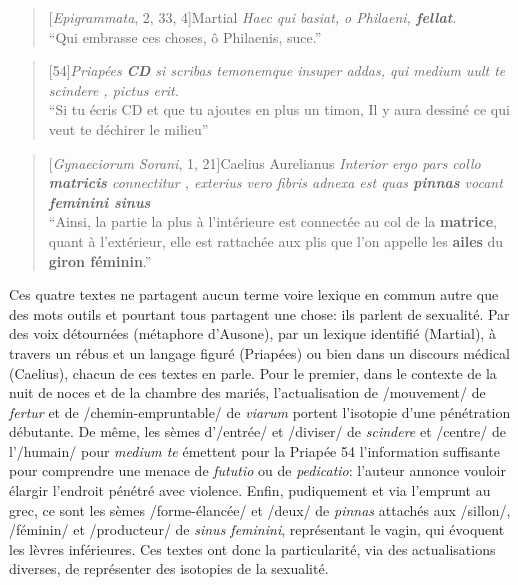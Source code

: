 \begin{quote}[\textit{Epigrammata}, 2, 33, 4]{Martial}
    \textit{Haec qui basiat, o Philaeni, \textbf{fellat}. \\}
    \enquote{Qui embrasse ces choses, ô Philaenis, suce.}
\end{quote}

\begin{quote}[54]{\textit{Priapées}}
    \textit{\textbf{CD} si scribas temonemque insuper addas, qui medium uult te scindere , pictus erit.} \\
    \enquote{Si tu écris CD et que tu ajoutes en plus un timon, Il y aura dessiné ce qui veut te déchirer le milieu}
\end{quote}

\begin{quote}[\textit{Gynaeciorum Sorani}, 1, 21]{Caelius Aurelianus}
    \textit{Interior ergo pars collo \textbf{matricis} connectitur , exterius vero fibris adnexa est quas \textbf{pinnas} vocant \textbf{feminini sinus}} \\
    \enquote{Ainsi, la partie la plus à l'intérieure est connectée au col de la \textbf{matrice}, quant à l'extérieur, elle est rattachée aux plis que l'on appelle les \textbf{ailes} du \textbf{giron féminin}.}
\end{quote}

Ces quatre textes ne partagent aucun terme voire lexique en commun autre que des mots outils et pourtant tous partagent une chose: ils parlent de sexualité. Par des voix détournées (métaphore d'Ausone), par un lexique identifié (Martial), à travers un rébus et un langage figuré (Priapées) ou bien dans un discours médical (Caelius), chacun de ces textes en parle. Pour le premier, dans le contexte de la nuit de noces et de la chambre des mariés, l'actualisation de /mouvement/ de \textit{fertur} et de /chemin-empruntable/ de \textit{viarum} portent l'isotopie d'une pénétration débutante. De même, les sèmes d'/entrée/ et /diviser/ de \textit{scindere} et /centre/ de l'/humain/ pour \textit{medium te} émettent pour la Priapée 54 l'information suffisante pour comprendre une menace de \textit{fututio} ou de \textit{pedicatio}: l'auteur annonce vouloir élargir l'endroit pénétré avec violence. Enfin, pudiquement et via l'emprunt au grec, ce sont les sèmes /forme-élancée/ et /deux/ de \textit{pinnas} attachés aux /sillon/, /féminin/ et /producteur/ de \textit{sinus feminini}, représentant le vagin, qui évoquent les lèvres inférieures. Ces textes ont donc la particularité, via des actualisations diverses, de représenter des isotopies de la sexualité.

